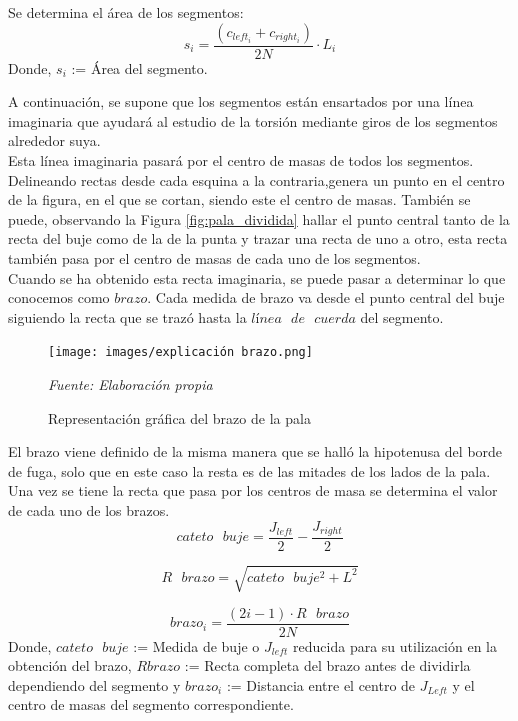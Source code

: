 \begin{definicion}
Se determina el área de los segmentos:
$$ s_{i} = \dfrac{(c_{left_i} + c_{right_i})}{2N} \cdot L_i $$
Donde,
\centering $s_i$ := Área del segmento.
\label{def:area_segmentos}
\end{definicion}


A continuación, se supone que los segmentos están ensartados por una línea imaginaria que ayudará al estudio de la torsión mediante giros de los segmentos alrededor suya. \\

Esta línea imaginaria pasará por el centro de masas de todos los segmentos. Delineando rectas desde cada esquina a la contraria,genera un punto en el centro de la figura, en el que se cortan, siendo este el centro de masas. También se puede, observando la Figura \ref{fig:pala_dividida} hallar el punto central tanto de la recta del buje como de la de la punta y trazar una recta de uno a otro, esta recta también pasa por el centro de masas de cada uno de los segmentos.\\

Cuando se ha obtenido esta recta imaginaria, se puede pasar a determinar lo que conocemos como $brazo$. Cada medida de brazo va desde el punto central del buje siguiendo la recta que se trazó hasta la $línea \text{ } de \text{ } cuerda$ del segmento.


    \begin{figure}[H]
    \centering
    \texttt{[image: images/explicación brazo.png]}
    \caption{Representación gráfica del brazo de la pala}
    \label{fig:exp_brazo}
    \textit{Fuente: Elaboración propia}
\end{figure}

\begin{definicion}
El brazo viene definido de la misma manera que se halló la hipotenusa del borde de fuga, solo que en este caso la resta es de las mitades de los lados de la pala. Una vez se tiene la recta que pasa por los centros de masa se determina el valor de cada uno de los brazos.
$$ cateto \text{ } buje = \dfrac{J_{left}}{2} - \dfrac{J_{right}}{2} $$

$$ R \text{ } brazo = \sqrt{cateto \text{ } buje^{2} + L^{2}}$$

$$ brazo_i = \dfrac{(2i -1) \cdot R \text{ } brazo}{2N} $$
Donde, $cateto \text{ } buje$ := Medida de buje o $J_{left}$ reducida para su utilización en la obtención del brazo, $R brazo$ := Recta completa del brazo antes de dividirla dependiendo del segmento y \hspace{10pt} $brazo_i$ := Distancia entre el centro de $J_{Left}$ y el centro de masas del segmento correspondiente.
\centering 
\label{def:brazo}
\end{definicion}


